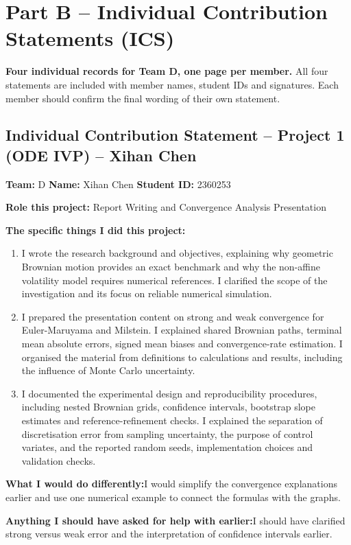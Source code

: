 \section{Part B -- Individual Contribution Statements (ICS)}
\label{app:ics}
\textbf{Four individual records for Team D, one page per member.} All four statements are included with member names, student IDs and signatures. Each member should confirm the final wording of their own statement.
\clearpage
\subsection*{Individual Contribution Statement -- Project 1 (ODE IVP) -- Xihan Chen}
\textbf{Team:} D \quad \textbf{Name:} Xihan Chen \quad \textbf{Student ID:} 2360253

\textbf{Role this project:} Report Writing and Convergence Analysis Presentation

\textbf{The specific things I did this project:}
\begin{enumerate}[leftmargin=*]
\item I wrote the research background and objectives, explaining why geometric Brownian motion provides an exact benchmark and why the non-affine volatility model requires numerical references. I clarified the scope of the investigation and its focus on reliable numerical simulation.
\item I prepared the presentation content on strong and weak convergence for Euler-Maruyama and Milstein. I explained shared Brownian paths, terminal mean absolute errors, signed mean biases and convergence-rate estimation. I organised the material from definitions to calculations and results, including the influence of Monte Carlo uncertainty.
\item I documented the experimental design and reproducibility procedures, including nested Brownian grids, confidence intervals, bootstrap slope estimates and reference-refinement checks. I explained the separation of discretisation error from sampling uncertainty, the purpose of control variates, and the reported random seeds, implementation choices and validation checks.
\end{enumerate}

\textbf{What I would do differently:}\newline I would simplify the convergence explanations earlier and use one numerical example to connect the formulas with the graphs.

\textbf{Anything I should have asked for help with earlier:}\newline I should have clarified strong versus weak error and the interpretation of confidence intervals earlier.

